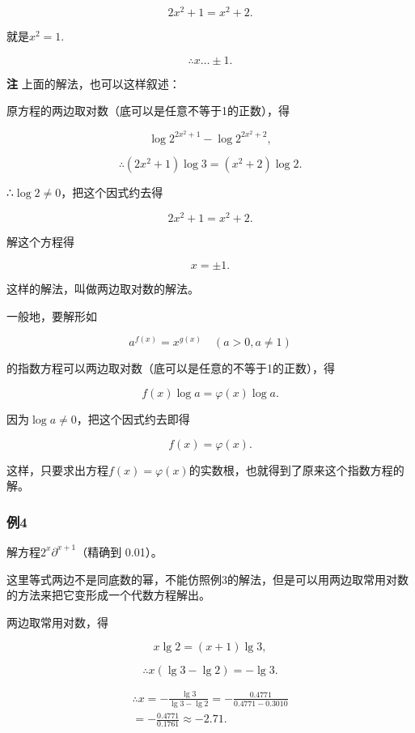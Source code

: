 \[
2 x^{2} + 1 = x^{2} + 2.
\]

就是\(x^{2} = 1.\)

\[
\therefore x \dots \pm 1.
\]

\textbf{注} 上面的解法，也可以这样叙述：

原方程的两边取对数（底可以是任意不等于1的正数），得

\[
\log 2^{2 x^{2} + 1} - \log 2^{2 x^{2} + 2},
\]

\[
\therefore (2 x^{2} + 1) \log 3 = (x^{2} + 2) \log 2.
\]

∴\(\log 2 \neq 0\)，把这个因式约去得

\[
2 x^{2} + 1 = x^{2} + 2.
\]

解这个方程得

\[
x = \pm 1.
\]

这样的解法，叫做两边取对数的解法。

一般地，要解形如

\[
a^{f (x)} = x^{g (x)} \quad (a > 0, a \neq 1)
\]

的指数方程可以两边取对数（底可以是任意的不等于1的正数），得

\[
f (x) \log a = \varphi (x) \log a.
\]

因为\(\log a \neq 0\)，把这个因式约去即得

\[
f (x) = \varphi (x).
\]

这样，只要求出方程\(f(x) = \varphi(x)\)的实数根，也就得到了原来这个指数方程的解。

\subsubsection{例4}

解方程\(2^{x}\)\(\partial^{x+1}\)（精确到 0.01）。

这里等式两边不是同底数的幂，不能仿照例3的解法，但是可以用两边取常用对数的方法来把它变形成一个代数方程解出。

 两边取常用对数，得

\[
x \lg 2 = (x + 1) \lg 3,
\]

\[
\therefore x (\lg 3 - \lg 2) = - \lg 3.
\]

\[
\begin{array}{l} \therefore x = - \frac{\lg 3}{\lg 3 - \lg 2} = - \frac{0.4771}{0.4771 - 0.3010} \\ = - \frac{0.4771}{0.1761} \approx - 2.71. \\ \end{array}
\]

